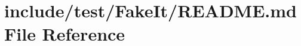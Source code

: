 \hypertarget{include_2test_2FakeIt_2README_8md}{}\section{include/test/\+Fake\+It/\+R\+E\+A\+D\+ME.md File Reference}
\label{include_2test_2FakeIt_2README_8md}
